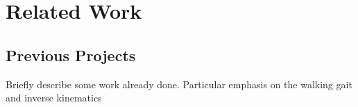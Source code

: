 \section{Related Work}

\subsection{ Previous Projects }

Briefly describe some work already done. 
Particular emphasis on the walking gait and inverse kinematics

